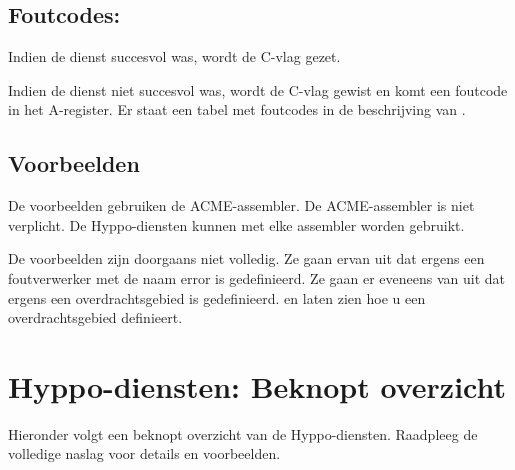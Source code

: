 \subsection{Foutcodes:}

Indien de dienst succesvol was, wordt de C-vlag gezet.

Indien de dienst niet succesvol was, wordt de C-vlag gewist en komt een foutcode in het A-register. Er staat een tabel met foutcodes in de beschrijving van .

\subsection{Voorbeelden}De voorbeelden gebruiken de ACME-assembler. De ACME-assembler is niet verplicht. De Hyppo-diensten kunnen met elke assembler worden gebruikt.

De voorbeelden zijn doorgaans niet volledig. Ze gaan ervan uit dat ergens een foutverwerker met de naam error is gedefinieerd. Ze gaan er eveneens van uit dat ergens een overdrachtsgebied is gedefinieerd.  en  laten zien hoe u een overdrachtsgebied definieert.


\newpage
\section{Hyppo-diensten: Beknopt overzicht}

Hieronder volgt een beknopt overzicht van de Hyppo-diensten. Raadpleeg de volledige naslag voor details en voorbeelden.

